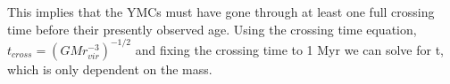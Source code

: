 This implies that the YMCs must have gone through at least one full crossing time before their presently observed age. Using the crossing time equation, $t_{cross}=(GMr_{vir}^{-3})^{-1/2}$ and fixing the crossing time to 1 Myr we can solve for t, which is only dependent on the mass.\cite{Arce_1999}